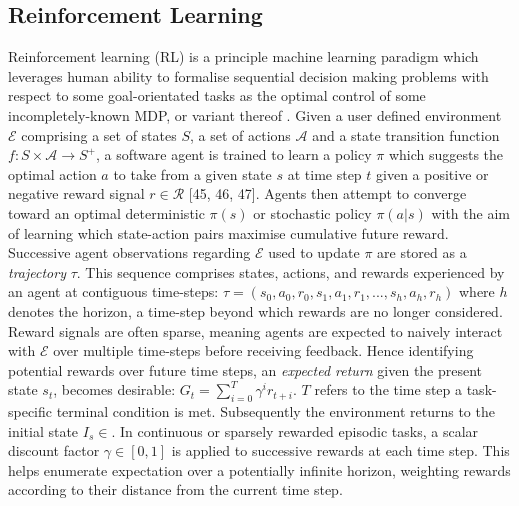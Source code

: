 \documentclass[runningheads]{llncs}
\begin{document}
\subsection{Reinforcement Learning}

Reinforcement learning (RL) is a principle machine learning paradigm which leverages human ability to formalise sequential decision making problems with respect to some goal-orientated tasks as the optimal control of some incompletely-known MDP, or variant thereof \cite{sutton2018reinforcement}. Given a user defined environment $\mathcal{E}$ comprising a set of states $S$, a set of actions $\mathcal{A}$ and a state transition function $f: S \times \mathcal{A} \to S^+$, a software agent is trained to learn a policy $\pi$ which suggests the optimal action $a$ to take from a given state $s$ at time step $t$ given a positive or negative reward signal $r \in \mathcal{R}$ [45, 46, 47]. Agents then attempt to converge toward an optimal deterministic $\pi(s)$ or stochastic policy $\pi(a|s)$ with the aim of learning which state-action pairs maximise cumulative future reward. Successive agent observations regarding $\mathcal{E}$ used to update $\pi$ are stored as a \textit{trajectory} $\tau$. This sequence comprises states, actions, and rewards experienced by an agent at contiguous time-steps:
\begin{math}
	\tau = (s_0, a_0, r_0, s_1,a_1,r_1,...,s_h,a_h,r_h)
\end{math}
where $h$ denotes the horizon, a time-step beyond which rewards are no longer considered. \\

Reward signals are often sparse, meaning agents are expected to naively interact with $\mathcal{E}$ over multiple time-steps before receiving feedback. Hence identifying potential rewards over future time steps, an \textit{expected return} given the present state $s_t$, becomes desirable: \begin{math}
	G_t = \sum_{i=0}^{T} \gamma^{i}r_{t+i}.
\end{math}
$T$ refers to the time step a task-specific terminal condition is met. Subsequently the environment returns to the initial state $I_s \in $. In continuous or sparsely rewarded episodic tasks, a scalar discount factor $\gamma \in [0,1]$ is applied to successive rewards at each time step. This helps enumerate expectation over a potentially infinite horizon, weighting rewards according to their distance from the current time step. \\
\end{document}
